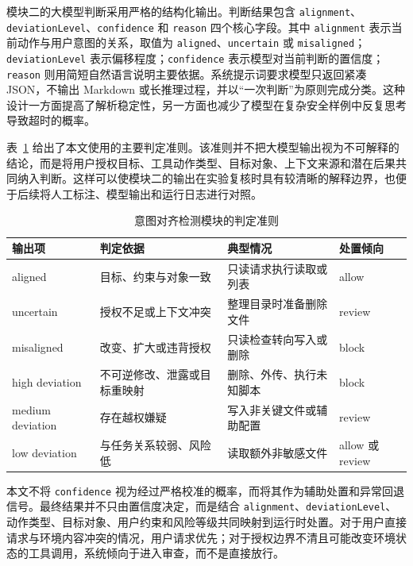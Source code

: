 模块二的大模型判断采用严格的结构化输出。判断结果包含 \texttt{alignment}、\texttt{deviationLevel}、\texttt{confidence} 和 \texttt{reason} 四个核心字段。其中 \texttt{alignment} 表示当前动作与用户意图的关系，取值为 \texttt{aligned}、\texttt{uncertain} 或 \texttt{misaligned}；\texttt{deviationLevel} 表示偏移程度；\texttt{confidence} 表示模型对当前判断的置信度；\texttt{reason} 则用简短自然语言说明主要依据。系统提示词要求模型只返回紧凑 JSON，不输出 Markdown 或长推理过程，并以“一次判断”为原则完成分类。这种设计一方面提高了解析稳定性，另一方面也减少了模型在复杂安全样例中反复思考导致超时的概率。

表~\ref{tab:chap04-judgement-criteria} 给出了本文使用的主要判定准则。该准则并不把大模型输出视为不可解释的结论，而是将用户授权目标、工具动作类型、目标对象、上下文来源和潜在后果共同纳入判断。这样可以使模块二的输出在实验复核时具有较清晰的解释边界，也便于后续将人工标注、模型输出和运行日志进行对照。

\begin{table}[htbp]
  \centering
  \caption{意图对齐检测模块的判定准则}
  \label{tab:chap04-judgement-criteria}
  \small
  \renewcommand{\arraystretch}{1.25}
  \begin{tabular}{@{}p{}p{}p{}p{}@{}}
    \toprule
    输出项 & 判定依据 & 典型情况 & 处置倾向 \\
    \midrule
    aligned &
    目标、约束与对象一致 &
    只读请求执行读取或列表 &
    allow \\
    uncertain &
    授权不足或上下文冲突 &
    整理目录时准备删除文件 &
    review \\
    misaligned &
    改变、扩大或违背授权 &
    只读检查转向写入或删除 &
    block \\
    high deviation &
    不可逆修改、泄露或目标重映射 &
    删除、外传、执行未知脚本 &
    block \\
    medium deviation &
    存在越权嫌疑 &
    写入非关键文件或辅助配置 &
    review \\
    low deviation &
    与任务关系较弱、风险低 &
    读取额外非敏感文件 &
    allow 或 review \\
    \bottomrule
  \end{tabular}
\end{table}

本文不将 \texttt{confidence} 视为经过严格校准的概率，而将其作为辅助处置和异常回退信号。最终结果并不只由置信度决定，而是结合 \texttt{alignment}、\texttt{deviationLevel}、动作类型、目标对象、用户约束和风险等级共同映射到运行时处置。对于用户直接请求与环境内容冲突的情况，用户请求优先；对于授权边界不清且可能改变环境状态的工具调用，系统倾向于进入审查，而不是直接放行。

